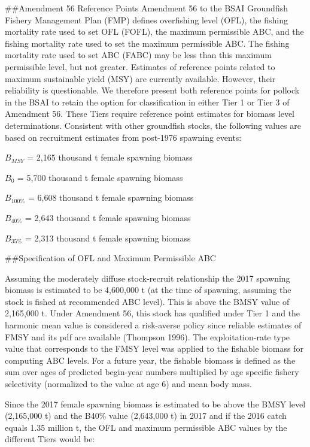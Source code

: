 \#\#Amendment 56 Reference Points Amendment 56 to the BSAI Groundfish
Fishery Management Plan (FMP) defines overfishing level (OFL), the
fishing mortality rate used to set OFL (FOFL), the maximum permissible
ABC, and the fishing mortality rate used to set the maximum permissible
ABC. The fishing mortality rate used to set ABC (FABC) may be less than
this maximum permissible level, but not greater. Estimates of reference
points related to maximum sustainable yield (MSY) are currently
available. However, their reliability is questionable. We therefore
present both reference points for pollock in the BSAI to retain the
option for classification in either Tier 1 or Tier 3 of Amendment 56.
These Tiers require reference point estimates for biomass level
determinations. Consistent with other groundfish stocks, the following
values are based on recruitment estimates from post-1976 spawning
events:

\(B_{MSY}\) = 2,165 thousand t female spawning biomass

\(B_{0}\) = 5,700 thousand t female spawning biomass

\(B_{100\%}\) = 6,608 thousand t female spawning biomass

\(B_{40\%}\) = 2,643 thousand t female spawning biomass

\(B_{35\%}\) = 2,313 thousand t female spawning biomass

\#\#Specification of OFL and Maximum Permissible ABC

Assuming the moderately diffuse stock-recruit relationship the 2017
spawning biomass is estimated to be 4,600,000 t (at the time of
spawning, assuming the stock is fished at recommended ABC level). This
is above the BMSY value of 2,165,000 t. Under Amendment 56, this stock
has qualified under Tier 1 and the harmonic mean value is considered a
risk-averse policy since reliable estimates of FMSY and its pdf are
available (Thompson 1996). The exploitation-rate type value that
corresponds to the FMSY level was applied to the fishable biomass for
computing ABC levels. For a future year, the fishable biomass is defined
as the sum over ages of predicted begin-year numbers multiplied by age
specific fishery selectivity (normalized to the value at age 6) and mean
body mass.

Since the 2017 female spawning biomass is estimated to be above the BMSY
level (2,165,000 t) and the B40\% value (2,643,000 t) in 2017 and if the
2016 catch equals 1.35 million t, the OFL and maximum permissible ABC
values by the different Tiers would be:

